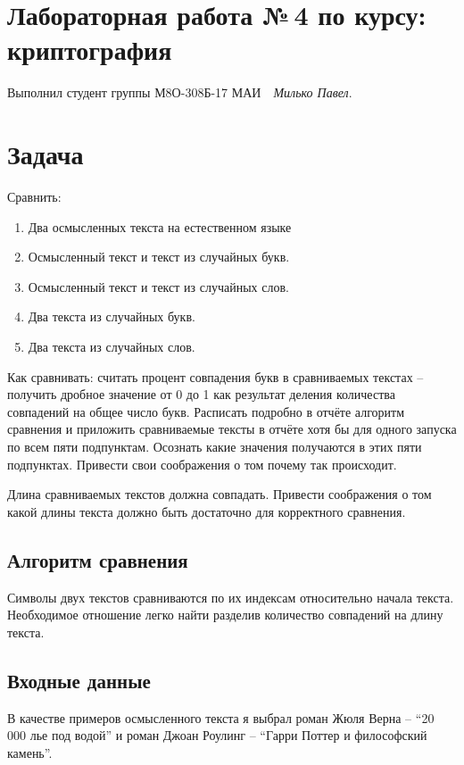 \documentclass[12pt]{article}
\newcommand{\se}[1]{\section*{\bf #1}}
\begin{document}
\section*{\centering Лабораторная работа №\,4 по курсу:\\ криптография}

Выполнил студент группы М8О-308Б-17 МАИ \,\, \textit{Милько Павел}.

\se{Задача}

Сравнить:

\begin{enumerate}
	\item Два осмысленных текста на естественном языке
	\item Осмысленный текст и текст из случайных букв.
	\item Осмысленный текст и текст из случайных слов.
	\item Два текста из случайных букв.
	\item Два текста из случайных слов.
\end{enumerate}

Как сравнивать: считать процент совпадения букв в сравниваемых текстах -- получить
дробное значение от 0 до 1 как результат деления количества совпадений на общее число
букв. Расписать подробно в отчёте алгоритм сравнения и приложить сравниваемые тексты в
отчёте хотя бы для одного запуска по всем пяти подпунктам. Осознать какие значения
получаются в этих пяти подпунктах. Привести свои соображения о том почему так
происходит.

Длина сравниваемых текстов должна совпадать. Привести соображения о том какой длины
текста должно быть достаточно для корректного сравнения.

\subsection*{Алгоритм сравнения}

Символы двух текстов сравниваются по их индексам относительно начала текста.
Необходимое отношение легко найти разделив количество совпадений на длину текста.

\subsection*{Входные данные}

В качестве примеров осмысленного текста я выбрал роман Жюля Верна -- ``20 000 лье под водой'' и
роман Джоан Роулинг -- ``Гарри Поттер и философский камень''.
\end{document}
